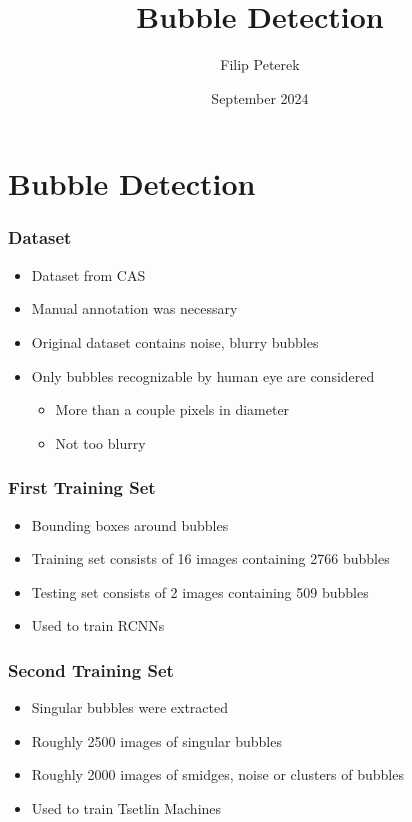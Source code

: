 \documentclass{beamer}
\title{Bubble Detection}
\author{Filip Peterek}
\institute{V\v{S}B-TUO}
\date{September 2024}
\begin{document}
\frame{\titlepage}

\section{Bubble Detection}

\begin{frame}
    \frametitle{Dataset}

    \begin{itemize}
        \item Dataset from CAS
        \item Manual annotation was necessary
        \item Original dataset contains noise, blurry bubbles
        \item Only bubbles recognizable by human eye are considered
        \begin{itemize}
            \item More than a couple pixels in diameter
            \item Not too blurry
        \end{itemize}
    \end{itemize}

\end{frame}

\begin{frame}
    \frametitle{First Training Set}

    \begin{itemize}
        \item Bounding boxes around bubbles
        \item Training set consists of 16 images containing 2766 bubbles
        \item Testing set consists of 2 images containing 509 bubbles
        \item Used to train RCNNs
    \end{itemize}

\end{frame}

\begin{frame}
    \frametitle{Second Training Set}

    \begin{itemize}
        \item Singular bubbles were extracted
        \item Roughly 2500 images of singular bubbles
        \item Roughly 2000 images of smidges, noise or clusters of bubbles
        \item Used to train Tsetlin Machines
    \end{itemize}

\end{frame}
\end{document}
